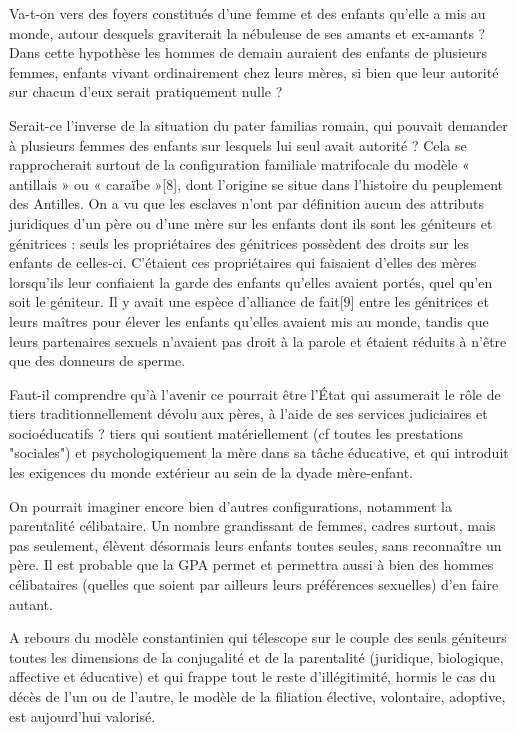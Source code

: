 
 Va-t-on vers des foyers constitués d'une femme et des enfants qu'elle a mis au monde, autour desquels graviterait la nébuleuse de ses amants et ex-amants ? Dans cette hypothèse les hommes de demain auraient des enfants de plusieurs femmes, enfants vivant ordinairement chez leurs mères, si bien que leur autorité sur chacun d'eux serait pratiquement nulle ? 
 
 Serait-ce l'inverse de la situation du pater familias romain, qui pouvait demander à plusieurs femmes des enfants sur lesquels lui seul avait autorité ? Cela se rapprocherait surtout de la configuration familiale matrifocale du modèle « antillais » ou « caraïbe »[8], dont l'origine se situe dans l'histoire du peuplement des Antilles. On a vu que les esclaves n'ont par définition aucun des attributs juridiques d'un père ou d'une mère sur les enfants dont ils sont les géniteurs et génitrices : seuls les propriétaires des génitrices possèdent des droits sur les enfants de celles-ci. C'étaient ces propriétaires qui faisaient d'elles des mères lorsqu'ils leur confiaient la garde des enfants qu'elles avaient portés, quel qu'en soit le géniteur. Il y avait une espèce d'alliance de fait[9] entre les génitrices et leurs maîtres pour élever les enfants qu'elles avaient mis au monde, tandis que leurs partenaires sexuels n'avaient pas droit à la parole et étaient réduits à n'être que des donneurs de sperme. 
 
 Faut-il comprendre qu'à l'avenir ce pourrait être l'État qui assumerait le rôle de tiers traditionnellement dévolu aux pères, à l'aide de ses services judiciaires et socioéducatifs ? tiers qui soutient matériellement (cf toutes les prestations "sociales") et psychologiquement la mère dans sa tâche éducative, et qui introduit les exigences du monde extérieur au sein de la dyade mère-enfant.
 
 On pourrait imaginer encore bien d'autres configurations, notamment la parentalité célibataire. Un nombre grandissant de femmes, cadres surtout, mais pas seulement, élèvent désormais leurs enfants toutes seules, sans reconnaître un père. Il est probable que la GPA permet et permettra aussi à bien des hommes célibataires (quelles que soient par ailleurs leurs préférences sexuelles) d'en faire autant.
 
 A rebours du modèle constantinien qui télescope sur le couple des seuls géniteurs toutes les dimensions de la conjugalité et de la parentalité (juridique, biologique, affective et éducative) et qui frappe tout le reste d'illégitimité, hormis le cas du décès de l'un ou de l'autre, le modèle de la filiation élective, volontaire, adoptive, est aujourd'hui valorisé. 
 
